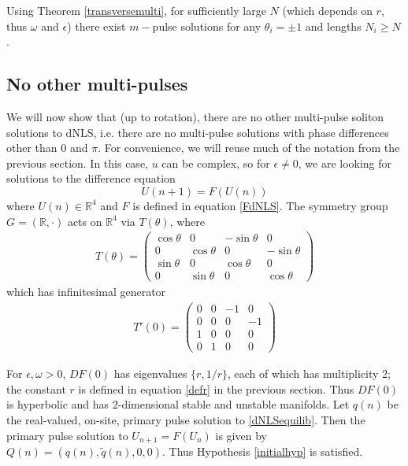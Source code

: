 \documentclass[12pt]{article}
\def\R{{\mathbb R}}
\begin{document}
Using Theorem \ref{transversemulti}, for sufficiently large $N$ (which depends on $r$, thus $\omega$ and $\epsilon$) there exist $m-$pulse solutions for any $\theta_i = \pm 1$ and lengths $N_i \geq N$. 

\subsection{No other multi-pulses}

We will now show that (up to rotation), there are no other multi-pulse soliton solutions to dNLS, i.e. there are no multi-pulse solutions with phase differences other than $0$ and $\pi$. For convenience, we will reuse much of the notation from the previous section. In this case, $u$ can be complex, so for $\epsilon \neq 0$, we are looking for solutions to the difference equation 
\begin{equation}\label{dNLSdiff}
U(n+1) = F(U(n))
\end{equation}
where $U(n) \in \R^4$ and $F$ is defined in equation \eqref{FdNLS}. The symmetry group $G = (\R, \cdot)$ acts on $\R^4$ via $T(\theta)$, where
\begin{align}\label{TdNLS}
T(\theta) =
\begin{pmatrix}
\cos\theta & 0 &-\sin\theta & 0 \\
0 & \cos\theta & 0 &-\sin\theta \\
\sin\theta & 0 & \cos\theta & 0 \\
0 & \sin\theta & 0 & \cos\theta 
\end{pmatrix}
\end{align}
which has infinitesimal generator
\begin{align}\label{dnlsSgen}
T'(0) =
\begin{pmatrix}
0 & 0 &-1 & 0 \\
0 & 0 & 0 &-1 \\
1 & 0 & 0 & 0 \\
0 & 1 & 0 & 0 
\end{pmatrix}
\end{align}

For $\epsilon, \omega > 0$, $DF(0)$ has eigenvalues $\{r, 1/r\}$, each of which has multiplicity 2; the constant $r$ is defined in equation \eqref{defr} in the previous section. Thus $DF(0)$ is hyperbolic and has 2-dimensional stable and unstable manifolds. Let $q(n)$ be the real-valued, on-site, primary pulse solution to \eqref{dNLSequilib}. Then the primary pulse solution to $U_{n+1} = F(U_n)$ is given by $Q(n) = (q(n), \tilde{q}(n), 0, 0)$. Thus Hypothesis \ref{initialhyp} is satisfied.
\end{document}
